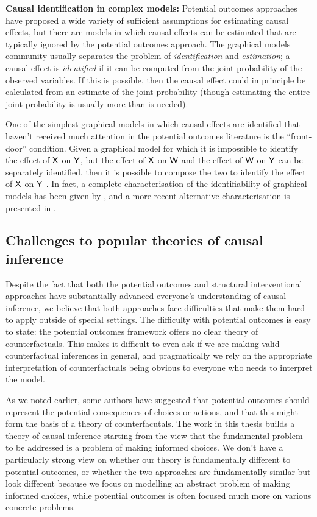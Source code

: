 \textbf{Causal identification in complex models:} Potential outcomes approaches have proposed a wide variety of sufficient assumptions for estimating causal effects, but there are models in which causal effects can be estimated that are typically ignored by the potential outcomes approach. The graphical models community usually separates the problem of \emph{identification} and \emph{estimation}; a causal effect is \emph{identified} if it can be computed from the joint probability of the observed variables. If this is possible, then the causal effect could in principle be calculated from an estimate of the joint probability (though estimating the entire joint probability is usually more than is needed). 

One of the simplest graphical models in which causal effects are identified that haven't received much attention in the potential outcomes literature is the ``front-door'' condition. Given a graphical model for which it is impossible to identify the effect of $\mathsf{X}$ on $\mathsf{Y}$, but the effect of $\mathsf{X}$ on $\mathsf{W}$ and the effect of $\mathsf{W}$ on $\mathsf{Y}$ can be separately identified, then it is possible to compose the two to identify the effect of $\mathsf{X}$ on $\mathsf{Y}$ \citep[Section 3.3.2]{pearl_causality:_2009}. In fact, a complete characterisation of the identifiability of graphical models has been given by \citet{shpitser_complete_2008}, and a more recent alternative characterisation is presented in \citet{richardson_nested_2017}.   

\subsection{Challenges to popular theories of causal inference}

Despite the fact that both the potential outcomes and structural interventional approaches have substantially advanced everyone's understanding of causal inference, we believe that both approaches face difficulties that make them hard to apply outside of special settings. The difficulty with potential outcomes is easy to state: the potential outcomes framework offers no clear theory of counterfactuals. This makes it difficult to even ask if we are making valid counterfactual inferences in general, and pragmatically we rely on the appropriate interpretation of counterfactuals being obvious to everyone who needs to interpret the model. 

As we noted earlier, some authors have suggested that potential outcomes should represent the potential consequences of choices or actions, and that this might form the basis of a theory of counterfacutals. The work in this thesis builds a theory of causal inference starting from the view that the fundamental problem to be addressed is a problem of making informed choices. We don't have a particularly strong view on whether our theory is fundamentally different to potential outcomes, or whether the two approaches are fundamentally similar but look different because we focus on modelling an abstract problem of making informed choices, while potential outcomes is often focused much more on various concrete problems.

